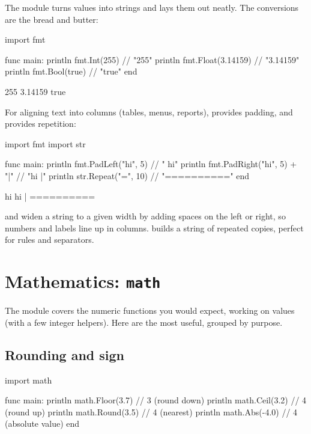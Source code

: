 The  module turns values into strings and lays them out neatly. The
conversions are the bread and butter:

\begin{salamen}
import fmt

func main:
    println fmt.Int(255)               // "255"
    println fmt.Float(3.14159)         // "3.14159"
    println fmt.Bool(true)             // "true"
end
\end{salamen}

\begin{progout}
255
3.14159
true
\end{progout}

For aligning text into columns (tables, menus, reports),  provides
padding, and  provides repetition:

\begin{salamen}
import fmt
import str

func main:
    println fmt.PadLeft("hi", 5)       // "   hi"
    println fmt.PadRight("hi", 5) + "|" // "hi   |"
    println str.Repeat("=", 10)        // "=========="
end
\end{salamen}

\begin{progout}
   hi
hi   |
==========
\end{progout}

 and  widen a string to a given width by adding
spaces on the left or right, so numbers and labels line up in columns.
 builds a string of repeated copies, perfect for rules and
separators.

\section{Mathematics: \texttt{math}}

The  module covers the numeric functions you would expect, working on
 values (with a few integer helpers). Here are the most useful, grouped
by purpose.

\subsection{Rounding and sign}

\begin{salamen}
import math

func main:
    println math.Floor(3.7)    // 3  (round down)
    println math.Ceil(3.2)     // 4  (round up)
    println math.Round(3.5)    // 4  (nearest)
    println math.Abs(-4.0)     // 4  (absolute value)
end
\end{salamen}

